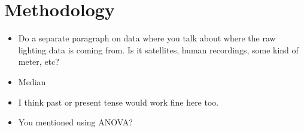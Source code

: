 \documentclass{basic}
\begin{document}
\section{Methodology}
\label{sec:org9ba9d76}
\begin{itemize}
\item Do a separate paragraph on data where you talk about where the raw lighting data is coming from. Is it satellites, human recordings, some kind of meter, etc?
\item Median
\item I think past or present tense would work fine here too.
\item You mentioned using ANOVA?
\end{itemize}
\end{document}
